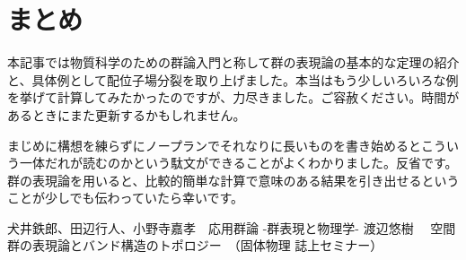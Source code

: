 \documentclass[uplatex,dvipdfmx,a4j,openany]{jsarticle}
\begin{document}
\section{まとめ}
本記事では物質科学のための群論入門と称して群の表現論の基本的な定理の紹介と、具体例として配位子場分裂を取り上げました。本当はもう少しいろいろな例を挙げて計算してみたかったのですが、力尽きました。ご容赦ください。時間があるときにまた更新するかもしれません。

まじめに構想を練らずにノープランでそれなりに長いものを書き始めるとこういう一体だれが読むのかという駄文ができることがよくわかりました。反省です。群の表現論を用いると、比較的簡単な計算で意味のある結果を引き出せるということが少しでも伝わっていたら幸いです。

\begin{thebibliography}{9}
	 犬井鉄郎、田辺行人、小野寺嘉孝　応用群論 -群表現と物理学-
	 渡辺悠樹 　空間群の表現論とバンド構造のトポロジー　（固体物理 誌上セミナー）　
\end{thebibliography}
\end{document}
